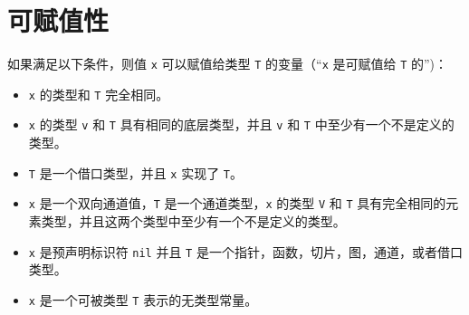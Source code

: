 \section{可赋值性}
如果满足以下条件，则值 \lstinline|x| 可以赋值给类型 \lstinline|T| 的变量（``\lstinline|x| 是可赋值给 \lstinline|T| 的'')：
\begin{itemize}
\item \lstinline|x| 的类型和 \lstinline|T| 完全相同。
\item \lstinline|x| 的类型 \lstinline|v| 和 \lstinline|T| 具有相同的底层类型，并且 \lstinline|v| 和 \lstinline|T| 中至少有一个不是定义的类型。
\item \lstinline|T| 是一个借口类型，并且 \lstinline|x| 实现了 \lstinline|T|。
\item \lstinline|x| 是一个双向通道值，\lstinline|T| 是一个通道类型，\lstinline|x| 的类型 \lstinline|V| 和 \lstinline|T| 具有完全相同的元素类型，并且这两个类型中至少有一个不是定义的类型。
\item \lstinline|x| 是预声明标识符 \lstinline|nil| 并且 \lstinline|T| 是一个指针，函数，切片，图，通道，或者借口类型。
\item \lstinline|x| 是一个可被类型 \lstinline|T| 表示的无类型常量。
\end{itemize}


